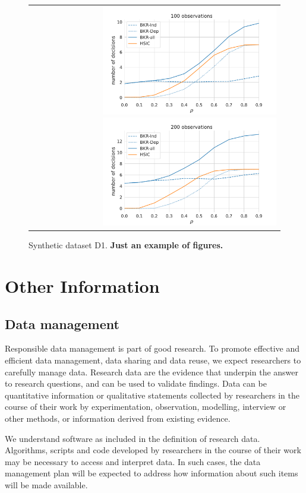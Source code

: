 \documentclass{article}
\begin{document}
\begin{figure}[htp]
  \centering
  \begin{tabular}{r}
    \includegraphics[height=1.9in]{100.pdf}
    \includegraphics[height=1.9in]{200.pdf}
  \end{tabular}
  \caption{Synthetic dataset D1. \textbf{Just an example of figures.}}
  \label{fig:2}
\end{figure}


\section{Other Information}
\label{sec:other}
\subsection{Data management}
Responsible data management is part of good research. To promote effective and efficient data management, data sharing and data reuse, we expect researchers to carefully manage data. Research data are the evidence that underpin the answer to research questions, and can be used to validate findings. Data can be quantitative information or qualitative statements collected by researchers in the course of their work by experimentation, observation, modelling, interview or other methods, or information derived from existing evidence.

We understand software as included in the definition of research data. Algorithms, scripts and code developed by researchers in the course of their work may be necessary to access and interpret data. In such cases, the data management plan will be expected to address how information about such items will be made available.
\end{document}
